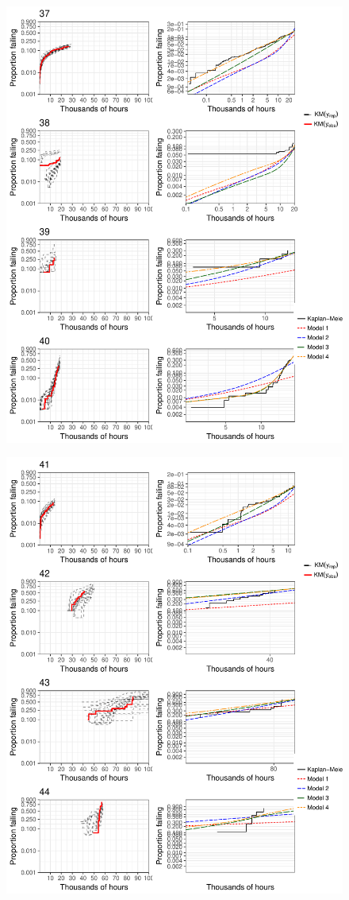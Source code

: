 \documentclass[12pt]{article}
\begin{document}
\begin{figure}[H]
\includegraphics[width=\textwidth]{ppcheck-v2-10.pdf}
\end{figure}
\begin{figure}[H]
\includegraphics[width=\textwidth]{ppcheck-v2-11.pdf}
\end{figure}
\clearpage
\end{document}
